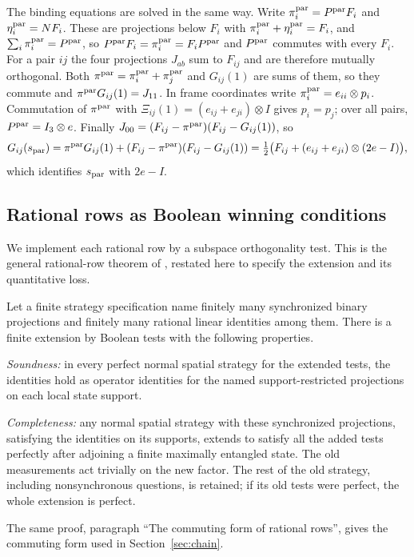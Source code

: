 The binding equations are solved in the same way. Write $\pi^{\rm par}_i=P^{\rm par}F_i$ and $\eta^{\rm par}_i=NF_i$. These are projections below $F_i$ with $\pi^{\rm par}_i+\eta^{\rm par}_i=F_i$, and $\sum_i\pi^{\rm par}_i=P^{\rm par}$, so $P^{\rm par}F_i=\pi^{\rm par}_i=F_iP^{\rm par}$ and $P^{\rm par}$ commutes with every $F_i$. For a pair $ij$ the four projections $J_{ab}$ sum to $F_{ij}$ and are therefore mutually orthogonal. Both $\pi^{\rm par}=\pi^{\rm par}_i+\pi^{\rm par}_j$ and $G_{ij}(1)$ are sums of them, so they commute and $\pi^{\rm par} G_{ij}(1)=J_{11}$. In frame coordinates write $\pi^{\rm par}_i=e_{ii}\otimes p_i$. Commutation of $\pi^{\rm par}$ with $\Xi_{ij}(1)=(e_{ij}+e_{ji})\otimes I$ gives $p_i=p_j$; over all pairs, $P^{\rm par}=I_3\otimes e$. Finally $J_{00}=(F_{ij}-\pi^{\rm par})(F_{ij}-G_{ij}(1))$, so
\[
 G_{ij}(s_{\rm par})=\pi^{\rm par} G_{ij}(1)+(F_{ij}-\pi^{\rm par})(F_{ij}-G_{ij}(1))=\tfrac12\bigl(F_{ij}+(e_{ij}+e_{ji})\otimes(2e-I)\bigr),
\]
which identifies $s_{\rm par}$ with $2e-I$.

\subsection{Rational rows as Boolean winning conditions}\label{sec:rows}
We implement each rational row by a subspace orthogonality test. This is the general rational-row theorem of \cite[Theorem~B]{Entropy}, restated here to specify the extension and its quantitative loss.

\begin{lemma}\label{lem:rows}
Let a finite strategy specification name finitely many synchronized binary projections and finitely many rational linear identities among them. There is a finite extension by Boolean tests with the following properties.

\emph{Soundness:} in every perfect normal spatial strategy for the extended tests, the identities hold as operator identities for the named support-restricted projections on each local state support.

\emph{Completeness:} any normal spatial strategy with these synchronized projections, satisfying the identities on its supports, extends to satisfy all the added tests perfectly after adjoining a finite maximally entangled state. The old measurements act trivially on the new factor. The rest of the old strategy, including nonsynchronous questions, is retained; if its old tests were perfect, the whole extension is perfect.
\end{lemma}
\begin{remark}
The same proof, paragraph ``The commuting form of rational rows'', gives the commuting form used in Section~\ref{sec:chain}.
\end{remark}

